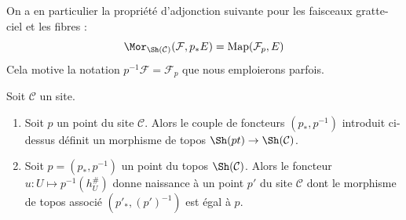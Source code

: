 \noindent
On a en particulier la propriété d’adjonction suivante pour les faisceaux
gratte-ciel et les fibres :
$$
\Mor_{\Sh(\mathcal{C})}(\mathcal{F}, p_*E)
=
\text{Map}(\mathcal{F}_p, E)
$$
Cela motive la notation $p^{-1}\mathcal{F} = \mathcal{F}_p$ que nous
emploierons parfois.

\begin{lemma}
\label{lemma-point-site-topos}
Soit $\mathcal{C}$ un site.
\begin{enumerate}
\item Soit $p$ un point du site $\mathcal{C}$.
Alors le couple de foncteurs $(p_*, p^{-1})$ introduit ci-dessus définit un
morphisme de topos $\Sh(pt) \to \Sh(\mathcal{C})$.
\item Soit $p = (p_*, p^{-1})$ un point du topos $\Sh(\mathcal{C})$.
Alors le foncteur $u : U \mapsto p^{-1}(h_U^\#)$ donne naissance à un point
$p'$ du site $\mathcal{C}$ dont le morphisme de topos associé
$(p'_*, (p')^{-1})$ est égal à $p$.
\end{enumerate}
\end{lemma}

